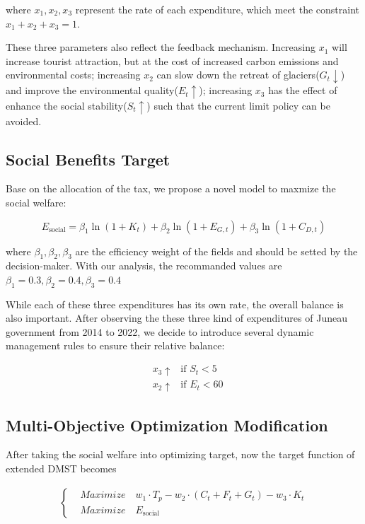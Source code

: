 \documentclass{mcmthesis}
\begin{document}
where $x_1, x_2, x_3$ represent the rate of each expenditure, which meet the constraint $x_1 + x_2 + x_3 = 1$.

These three parameters also reflect the feedback mechanism. Increasing $x_1$ will increase tourist attraction, 
but at the cost of increased carbon emissions and environmental costs; increasing $x_2$ can slow down the retreat
of glaciers($G_t \downarrow$) and improve the environmental quality($E_t \uparrow$); increasing $x_3$ has the effect of
enhance the social stability($S_t\uparrow$) such that the current limit policy can be avoided.

\subsection{Social Benefits Target}
Base on the allocation of the tax, we propose a novel model to maxmize the social welfare:

\begin{equation}
  E_{\text{social}} = \beta_1 \ln(1+K_t) + \beta_2 \ln(1 + E_{G,t}) + \beta_3 \ln(1 + C_{D,t})
\end{equation}

where $\beta_1, \beta_2, \beta_3$ are the efficiency weight of the fields and should be setted by the decision-maker.
With our analysis, the recommanded values are $\beta_1=0.3, \beta_2=0.4, \beta_3=0.4$

While each of these three expenditures has its own rate, the overall balance is also important. After observing the 
these three kind of expenditures of Juneau government from 2014 to 2022, we decide to introduce several 
dynamic management rules to ensure their relative balance:

\begin{equation}
\begin{aligned}
  & x_3\uparrow & \text{if } S_t < 5 \\
  & x_2\uparrow & \text{if } E_t < 60  
\end{aligned}
\end{equation}

\subsection{Multi-Objective Optimization Modification}
After taking the social welfare into optimizing target, now the target function of extended DMST becomes 

\begin{align}
\left\{
  \begin{aligned}
    & Maximize \quad w_1 \cdot T_p - w_2 \cdot (C_t + F_t + G_t) - w_3 \cdot K_t \\ 
    & Maximize \quad E_{\text{social}}
  \end{aligned}
\right.
\end{align}
\end{document}

